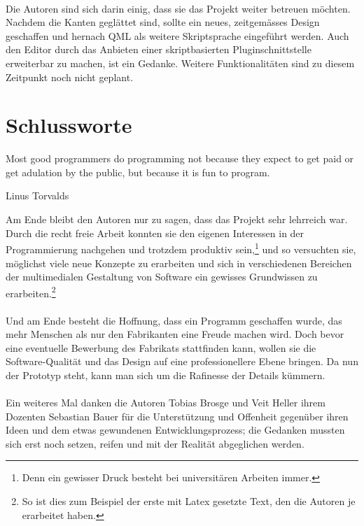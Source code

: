 \paragraph{}
    Die Autoren sind sich darin einig, dass sie das Projekt weiter betreuen möcht\-en. Nachdem die Kanten geglättet sind, sollte ein neues, zeitgemässes Design geschaffen
    und hernach QML als weitere Skriptsprache eingeführt werden. Auch den Editor durch das Anbieten einer skriptbasierten Pluginschnittstelle erweiterbar zu machen, ist
    ein Gedanke. Weitere Funktionalitäten sind zu diesem Zeitpunkt noch nicht geplant.

\newpage

\section{Schlussworte} \label{sec:Schluss}
	\epigraph{Most good programmers do programming not because they expect to get paid or get adulation by the public, but because it is fun to program.}{Linus Torvalds}
    Am Ende bleibt den Autoren nur zu sagen, dass das Projekt sehr lehrreich war. Durch die recht freie Arbeit konnten sie den eigenen Interessen in der Programmierung
    nachgehen und trotzdem produktiv sein,\footnote{Denn ein gewisser Druck besteht bei universitären Arbeiten immer.} und so versuchten sie, möglichst viele neue Konzepte
    zu erarbeiten und sich in verschiedenen Bereichen der multimedialen Gestaltung von Software ein gewisses Grundwissen zu erarbeiten.\footnote{So ist dies zum Beispiel
    der erste mit Latex gesetzte Text, den die Autoren je erarbeitet haben.}
\paragraph{}
    Und am Ende besteht die Hoffnung, dass ein Programm geschaffen wurde, das mehr Menschen als nur den Fabrikanten eine Freude machen wird. Doch bevor eine eventuelle
    Bewerbung des Fabrikats stattfinden kann, wollen sie die Software-Qualität und das Design auf eine professionellere Ebene bringen. Da nun der Prototyp steht, kann man sich
    um die Rafinesse der Details kümmern.
\paragraph{}
    Ein weiteres Mal danken die Autoren Tobias Brosge und Veit Heller ihrem Dozenten Sebastian Bauer für die Unterstützung und Offenheit gegenüber ihren Ideen und dem etwas
    gewundenen Entwicklungsprozess; die Gedanken mussten sich erst noch setzen, reifen und mit der Realität abgeglichen werden.

\newpage
